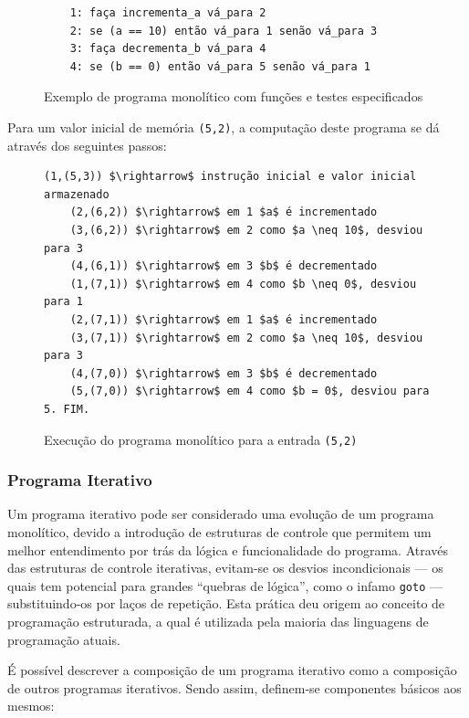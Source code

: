\documentclass[12pt,fleqn]{article}
\begin{document}
\begin{figure}[H]
\begin{verbatim}
    1: faça incrementa_a vá_para 2
    2: se (a == 10) então vá_para 1 senão vá_para 3
    3: faça decrementa_b vá_para 4
    4: se (b == 0) então vá_para 5 senão vá_para 1
\end{verbatim}
\caption{Exemplo de programa monolítico com funções e testes especificados}
\end{figure}

\noindent
Para um valor inicial de memória \verb|(5,2)|, a computação deste programa se dá
através dos seguintes passos:

\begin{figure}[H]
\begin{Verbatim}[commandchars=\\\{\},codes={\catcode`\$=3\catcode`\^=7}]
    (1,(5,3)) $\rightarrow$ instrução inicial e valor inicial armazenado
    (2,(6,2)) $\rightarrow$ em 1 $a$ é incrementado
    (3,(6,2)) $\rightarrow$ em 2 como $a \neq 10$, desviou para 3
    (4,(6,1)) $\rightarrow$ em 3 $b$ é decrementado
    (1,(7,1)) $\rightarrow$ em 4 como $b \neq 0$, desviou para 1
    (2,(7,1)) $\rightarrow$ em 1 $a$ é incrementado
    (3,(7,1)) $\rightarrow$ em 2 como $a \neq 10$, desviou para 3
    (4,(7,0)) $\rightarrow$ em 3 $b$ é decrementado
    (5,(7,0)) $\rightarrow$ em 4 como $b = 0$, desviou para 5. FIM.
\end{Verbatim}
\caption{Execução do programa monolítico para a entrada \texttt{(5,2)}}
\end{figure}


\subsubsection{Programa Iterativo}
Um programa iterativo pode ser considerado uma evolução de um programa
monolítico, devido a introdução de estruturas de controle que permitem um
melhor entendimento por trás da lógica e funcionalidade do programa. Através
das estruturas de controle iterativas, evitam-se os desvios incondicionais ---
os quais tem potencial para grandes ``quebras de lógica'', como o infamo
\verb|goto| --- substituindo-os por laços de repetição. Esta prática deu origem
ao conceito de programação estruturada, a qual é utilizada pela maioria das
linguagens de programação atuais.

É possível descrever a composição de um programa iterativo como a composição de
outros programas iterativos. Sendo assim, definem-se componentes básicos aos
mesmos:
\end{document}
